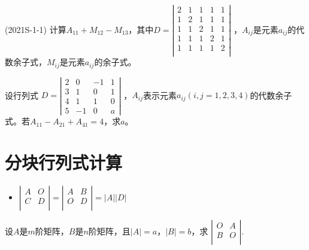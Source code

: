 \documentclass[lang=cn,newtx,10pt,scheme=chinese]{elegantbook}
\begin{document}
\begin{exercise}
    (2021S-1-1) 计算$A_{11} + M_{12} - M_{13}$，其中$D = 
    \left|
    \begin{array}{ccccc}
        2   & 1 & 1 & 1 & 1 \\
        1   & 2 & 1 & 1 & 1 \\
        1   & 1 & 2 & 1 & 1 \\
        1   & 1 & 1 & 2 & 1 \\
        1   & 1 & 1 & 1 & 2 \\
    \end{array}
    \right|
    $
    ，$A_{ij}$是元素$a_{ij}$的代数余子式，$M_{ij}$是元素$a_{ij}$的余子式。
\end{exercise}

\begin{exercise}
    设行列式
    $
    D=
    \left|
        \begin{array}{cccc}
            2 & 0 & -1 & 1 \\ 
            3 & 1 & 0 & 1 \\ 
            4 & 1 & 1 & 0 \\ 
            5 & -1 & 0 & a
        \end{array}
    \right|
    $
    ，$A_{ij}$表示元素$a_{ij}(i, j=1,2,3,4)$的代数余子式。若$A_{11}-A_{21}+A_{41}=4$，求$a$。
\end{exercise}

\section{分块行列式计算}

\begin{itemize}
    \item 
    $ 
    \left|
    \begin{array}{cc}
        A   & O \\
        C   & D \\
    \end{array}
    \right|
    =
    \left|
    \begin{array}{cc}
        A   & B \\
        O   & D \\
    \end{array}
    \right|
    = \left|A\right| \left|D\right|
    $
\end{itemize}

\begin{exercise}
    设$A$是$m$阶矩阵，$B$是$n$阶矩阵，且$\left|A\right|=a$，$\left|B\right|=b$，求
    $
    \left|
    \begin{array}{cc}
        O   & A \\
        B   & O \\
    \end{array}
	\right|
	.
    $
\end{exercise}
\end{document}
